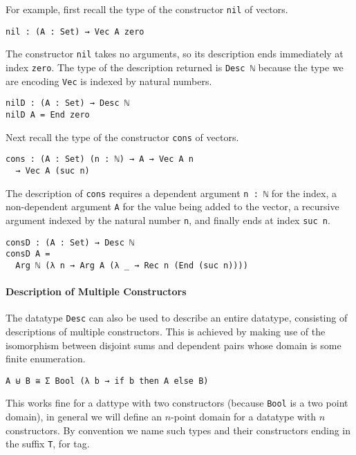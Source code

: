 \documentclass[preprint,nonatbib]{sigplanconf}
\begin{document}
For example, first recall the type of the
constructor {\tt nil} of vectors.

\begin{verbatim}
nil : (A : Set) → Vec A zero
\end{verbatim}

The constructor {\tt nil} takes no arguments, so its description
ends immediately at index {\tt zero}. The type of the description
returned is {\tt Desc ℕ} because the type we are encoding {\tt Vec}
is indexed by natural numbers.

\begin{verbatim}
nilD : (A : Set) → Desc ℕ
nilD A = End zero
\end{verbatim}

Next recall the type of the
constructor {\tt cons} of vectors.

\begin{verbatim}
cons : (A : Set) (n : ℕ) → A → Vec A n
  → Vec A (suc n)
\end{verbatim}

The description of {\tt cons} requires a dependent argument
{\tt n : ℕ} for the index, a non-dependent argument {\tt A} for the value
being added to the vector, a recursive argument indexed by the
natural number {\tt n}, and finally ends at index {\tt suc n}.

\begin{verbatim}
consD : (A : Set) → Desc ℕ
consD A =
  Arg ℕ (λ n → Arg A (λ _ → Rec n (End (suc n))))
\end{verbatim}

\paragraph{Description of Multiple Constructors}
\label{sec:background:multiple}

The datatype {\tt Desc} can also be used to describe an entire
datatype, consisting of descriptions of multiple constructors.
This is achieved by making use of the isomorphism between disjoint
sums and dependent pairs whose domain is some finite enumeration.

\begin{verbatim}
A ⊎ B ≅ Σ Bool (λ b → if b then A else B)
\end{verbatim}

This works fine for a dattype with two constructors (because {\tt Bool} is a two point domain),
in general we will define an $n$-point domain for a datatype with $n$ constructors. By
convention we name such types and their constructors ending in the suffix {\tt T}, for tag.
\end{document}
